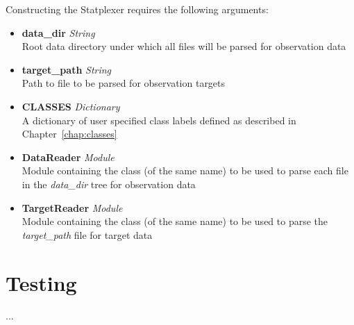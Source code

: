 Constructing the Statplexer requires the following arguments:

\begin{itemize}
    \item \textbf{data\_dir} \textit{String}\hfill\\
        Root data directory under which all files will be parsed for observation data
    \item \textbf{target\_path} \textit{String}\hfill\\
        Path to file to be parsed for observation targets
    \item \textbf{CLASSES} \textit{Dictionary}\hfill\\
        A dictionary of user specified class labels defined as described in
        Chapter~\ref{chap:classes}
    \item \textbf{DataReader} \textit{Module}\hfill\\
        Module containing the class (of the same name) to be used to parse each
        file in the \textit{data\_dir} tree for observation data
    \item \textbf{TargetReader} \textit{Module}\hfill\\
        Module containing the class (of the same name) to be used to parse the
        \textit{target\_path} file for target data
\end{itemize}


\section{Testing}

...


